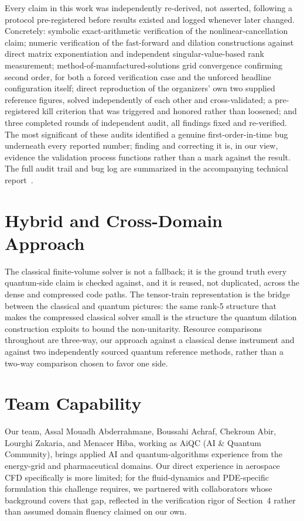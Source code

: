\documentclass[10.5pt,twocolumn]{article}
\begin{document}
Every claim in this work was independently re-derived, not asserted, following a protocol pre-registered before results existed and logged whenever later changed. Concretely: symbolic exact-arithmetic verification of the nonlinear-cancellation claim; numeric verification of the fast-forward and dilation constructions against direct matrix exponentiation and independent singular-value-based rank measurement; method-of-manufactured-solutions grid convergence confirming second order, for both a forced verification case and the unforced headline configuration itself; direct reproduction of the organizers' own two supplied reference figures, solved independently of each other and cross-validated; a pre-registered kill criterion that was triggered and honored rather than loosened; and three completed rounds of independent audit, all findings fixed and re-verified. The most significant of these audits identified a genuine first-order-in-time bug underneath every reported number; finding and correcting it is, in our view, evidence the validation process functions rather than a mark against the result. The full audit trail and bug log are summarized in the accompanying technical report~\cite{tgx2026}.

\section{Hybrid and Cross-Domain Approach}

The classical finite-volume solver is not a fallback; it is the ground truth every quantum-side claim is checked against, and it is reused, not duplicated, across the dense and compressed code paths. The tensor-train representation is the bridge between the classical and quantum pictures: the same rank-5 structure that makes the compressed classical solver small is the structure the quantum dilation construction exploits to bound the non-unitarity. Resource comparisons throughout are three-way, our approach against a classical dense instrument and against two independently sourced quantum reference methods, rather than a two-way comparison chosen to favor one side.

\section{Team Capability}

Our team, Assal Mouadh Abderrahmane, Boussahi Achraf, Chekroun Abir, Lourghi Zakaria, and Menacer Hiba, working as AiQC (AI \& Quantum Community), brings applied AI and quantum-algorithms experience from the energy-grid and pharmaceutical domains. Our direct experience in aerospace CFD specifically is more limited; for the fluid-dynamics and PDE-specific formulation this challenge requires, we partnered with collaborators whose background covers that gap, reflected in the verification rigor of Section~4 rather than assumed domain fluency claimed on our own.
\end{document}
